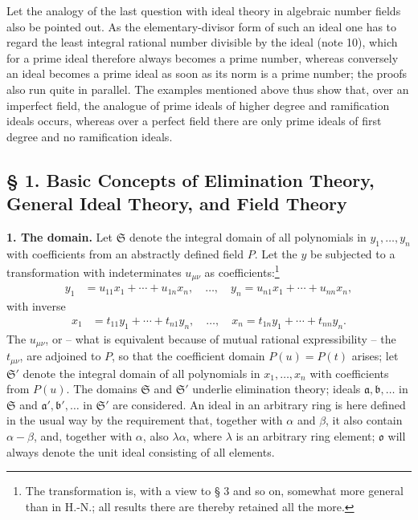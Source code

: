 \documentclass[11pt]{article}
\providecommand{\frakS}{\mathfrak S}
\providecommand{\fraka}{\mathfrak a}
\providecommand{\frakb}{\mathfrak b}
\providecommand{\frakb}{\mathfrak b}
\providecommand{\frako}{\mathfrak o}
\begin{document}
Let the analogy of the last question with ideal theory in algebraic number fields also be pointed out. As the elementary-divisor form of such an ideal one has to regard the least integral rational number divisible by the ideal (note 10), which for a prime ideal therefore always becomes a prime number, whereas conversely an ideal becomes a prime ideal as soon as its norm is a prime number; the proofs also run quite in parallel. The examples mentioned above thus show that, over an imperfect field, the analogue of prime ideals of higher degree and ramification ideals occurs, whereas over a perfect field there are only prime ideals of first degree and no ramification ideals.

\subsection*{§ 1. Basic Concepts of Elimination Theory, General Ideal Theory, and Field Theory}

\textbf{1. The domain.} Let $\frakS$ denote the integral domain of all polynomials in $y_1,\ldots,y_n$ with coefficients from an abstractly defined field $P$. Let the $y$ be subjected to a transformation with indeterminates $u_{\mu\nu}$ as coefficients:\footnote{The transformation is, with a view to § 3 and so on, somewhat more general than in H.-N.; all results there are thereby retained all the more.}
\begin{align}
 y_1&=u_{11}x_1+\cdots+u_{1n}x_n,\quad \ldots,\quad
 y_n=u_{n1}x_1+\cdots+u_{nn}x_n, \tag{1}
\end{align}
with inverse
\begin{align}
 x_1&=t_{11}y_1+\cdots+t_{n1}y_n,\quad \ldots,\quad
 x_n=t_{1n}y_1+\cdots+t_{nn}y_n. \tag{1'}
\end{align}
The $u_{\mu\nu}$, or -- what is equivalent because of mutual rational expressibility -- the $t_{\mu\nu}$, are adjoined to $P$, so that the coefficient domain $P(u)=P(t)$ arises; let $\frakS'$ denote the integral domain of all polynomials in $x_1,\ldots,x_n$ with coefficients from $P(u)$. The domains $\frakS$ and $\frakS'$ underlie elimination theory; ideals $\fraka,\frakb,\ldots$ in $\frakS$ and $\fraka',\frakb',\ldots$ in $\frakS'$ are considered. An ideal in an arbitrary ring is here defined in the usual way by the requirement that, together with $\alpha$ and $\beta$, it also contain $\alpha-\beta$, and, together with $\alpha$, also $\lambda\alpha$, where $\lambda$ is an arbitrary ring element; $\frako$ will always denote the unit ideal consisting of all elements.
\end{document}
